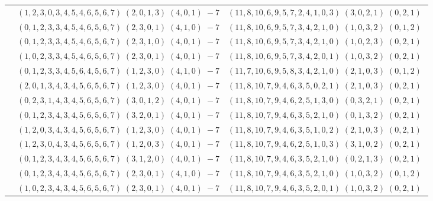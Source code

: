 \documentclass[11pt]{article}
\begin{document}
\begin{longtable}[l]{|c|c|c|}
 \cline{2-3} 
 & $(1 ,2 ,3 ,0 ,3 ,4 ,5 ,4 ,6 ,5 ,6 ,7) \;(2 ,0 ,1 ,3) \;(4 ,0 ,1) \;-7$ & $(11 ,8 ,10 ,6 ,9 ,5 ,7 ,2 ,4 ,1 ,0 ,3) \;(3 ,0 ,2 ,1) \;(0 ,2 ,1) \;$\\ 
 \cline{2-3} 
 & $(0 ,1 ,2 ,3 ,3 ,4 ,5 ,4 ,6 ,5 ,6 ,7) \;(2 ,3 ,0 ,1) \;(4 ,1 ,0) \;-7$ & $(11 ,8 ,10 ,6 ,9 ,5 ,7 ,3 ,4 ,2 ,1 ,0) \;(1 ,0 ,3 ,2) \;(0 ,1 ,2) \;$\\ 
 \cline{2-3} 
 & $(0 ,1 ,2 ,3 ,3 ,4 ,5 ,4 ,6 ,5 ,6 ,7) \;(2 ,3 ,1 ,0) \;(4 ,0 ,1) \;-7$ & $(11 ,8 ,10 ,6 ,9 ,5 ,7 ,3 ,4 ,2 ,1 ,0) \;(1 ,0 ,2 ,3) \;(0 ,2 ,1) \;$\\ 
 \cline{2-3} 
 & $(1 ,0 ,2 ,3 ,3 ,4 ,5 ,4 ,6 ,5 ,6 ,7) \;(2 ,3 ,0 ,1) \;(4 ,0 ,1) \;-7$ & $(11 ,8 ,10 ,6 ,9 ,5 ,7 ,3 ,4 ,2 ,0 ,1) \;(1 ,0 ,3 ,2) \;(0 ,2 ,1) \;$\\ 
 \cline{2-3} 
 & $(0 ,1 ,2 ,3 ,3 ,4 ,5 ,6 ,4 ,5 ,6 ,7) \;(1 ,2 ,3 ,0) \;(4 ,1 ,0) \;-7$ & $(11 ,7 ,10 ,6 ,9 ,5 ,8 ,3 ,4 ,2 ,1 ,0) \;(2 ,1 ,0 ,3) \;(0 ,1 ,2) \;$\\ 
 \cline{2-3} 
 & $(2 ,0 ,1 ,3 ,4 ,3 ,4 ,5 ,6 ,5 ,6 ,7) \;(1 ,2 ,3 ,0) \;(4 ,0 ,1) \;-7$ & $(11 ,8 ,10 ,7 ,9 ,4 ,6 ,3 ,5 ,0 ,2 ,1) \;(2 ,1 ,0 ,3) \;(0 ,2 ,1) \;$\\ 
 \cline{2-3} 
 & $(0 ,2 ,3 ,1 ,4 ,3 ,4 ,5 ,6 ,5 ,6 ,7) \;(3 ,0 ,1 ,2) \;(4 ,0 ,1) \;-7$ & $(11 ,8 ,10 ,7 ,9 ,4 ,6 ,2 ,5 ,1 ,3 ,0) \;(0 ,3 ,2 ,1) \;(0 ,2 ,1) \;$\\ 
 \cline{2-3} 
 & $(0 ,1 ,2 ,3 ,4 ,3 ,4 ,5 ,6 ,5 ,6 ,7) \;(3 ,2 ,0 ,1) \;(4 ,0 ,1) \;-7$ & $(11 ,8 ,10 ,7 ,9 ,4 ,6 ,3 ,5 ,2 ,1 ,0) \;(0 ,1 ,3 ,2) \;(0 ,2 ,1) \;$\\ 
 \cline{2-3} 
 & $(1 ,2 ,0 ,3 ,4 ,3 ,4 ,5 ,6 ,5 ,6 ,7) \;(1 ,2 ,3 ,0) \;(4 ,0 ,1) \;-7$ & $(11 ,8 ,10 ,7 ,9 ,4 ,6 ,3 ,5 ,1 ,0 ,2) \;(2 ,1 ,0 ,3) \;(0 ,2 ,1) \;$\\ 
 \cline{2-3} 
 & $(1 ,2 ,3 ,0 ,4 ,3 ,4 ,5 ,6 ,5 ,6 ,7) \;(1 ,2 ,0 ,3) \;(4 ,0 ,1) \;-7$ & $(11 ,8 ,10 ,7 ,9 ,4 ,6 ,2 ,5 ,1 ,0 ,3) \;(3 ,1 ,0 ,2) \;(0 ,2 ,1) \;$\\ 
 \cline{2-3} 
 & $(0 ,1 ,2 ,3 ,4 ,3 ,4 ,5 ,6 ,5 ,6 ,7) \;(3 ,1 ,2 ,0) \;(4 ,0 ,1) \;-7$ & $(11 ,8 ,10 ,7 ,9 ,4 ,6 ,3 ,5 ,2 ,1 ,0) \;(0 ,2 ,1 ,3) \;(0 ,2 ,1) \;$\\ 
 \cline{2-3} 
 & $(0 ,1 ,2 ,3 ,4 ,3 ,4 ,5 ,6 ,5 ,6 ,7) \;(2 ,3 ,0 ,1) \;(4 ,1 ,0) \;-7$ & $(11 ,8 ,10 ,7 ,9 ,4 ,6 ,3 ,5 ,2 ,1 ,0) \;(1 ,0 ,3 ,2) \;(0 ,1 ,2) \;$\\ 
 \cline{2-3} 
 & $(1 ,0 ,2 ,3 ,4 ,3 ,4 ,5 ,6 ,5 ,6 ,7) \;(2 ,3 ,0 ,1) \;(4 ,0 ,1) \;-7$ & $(11 ,8 ,10 ,7 ,9 ,4 ,6 ,3 ,5 ,2 ,0 ,1) \;(1 ,0 ,3 ,2) \;(0 ,2 ,1) \;$\\ 

\end{longtable}
\end{document}
